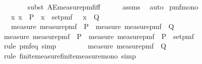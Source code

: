 \begin{isabellebody}
\ \ \ \ \ \ \isamarkupfalse%
\ {\isacharparenleft}{\kern0pt}subst\ AE{\isacharunderscore}{\kern0pt}measure{\isacharunderscore}{\kern0pt}pmf{\isacharunderscore}{\kern0pt}iff{\isacharparenright}{\kern0pt}\isanewline
\ \ \ \ \isamarkupfalse%
\ assms\ \isamarkupfalse%
\ auto%
\endisatagproof
{\isafoldproof}%
%
\isadelimproof
\isanewline
%
\endisadelimproof
\isanewline
{}\isamarkupfalse%
\ pmf{\isacharunderscore}{\kern0pt}mono{\isacharunderscore}{\kern0pt}{}{\isacharcolon}{\kern0pt}\isanewline
\ \ \ {\isachardoublequoteopen}{\isasymAnd}x{\isachardot}{\kern0pt}\ x\ {\isasymin}\ P\ {\isasymLongrightarrow}\ x\ {\isasymin}\ set{\isacharunderscore}{\kern0pt}pmf\ {\isasymOmega}\ {\isasymLongrightarrow}\ x\ {\isasymin}\ Q{\isachardoublequoteclose}\isanewline
\ \ \ {\isachardoublequoteopen}measure\ {\isacharparenleft}{\kern0pt}measure{\isacharunderscore}{\kern0pt}pmf\ {\isasymOmega}{\isacharparenright}{\kern0pt}\ P\ {\isasymle}\ measure\ {\isacharparenleft}{\kern0pt}measure{\isacharunderscore}{\kern0pt}pmf\ {\isasymOmega}{\isacharparenright}{\kern0pt}\ Q{\isachardoublequoteclose}\isanewline
%
\isadelimproof
%
\endisadelimproof
%
\isatagproof
{}\isamarkupfalse%
\ {\isacharminus}{\kern0pt}\isanewline
\ \ \isamarkupfalse%
\ {\isachardoublequoteopen}measure\ {\isacharparenleft}{\kern0pt}measure{\isacharunderscore}{\kern0pt}pmf\ {\isasymOmega}{\isacharparenright}{\kern0pt}\ P\ {\isacharequal}{\kern0pt}\ measure\ {\isacharparenleft}{\kern0pt}measure{\isacharunderscore}{\kern0pt}pmf\ {\isasymOmega}{\isacharparenright}{\kern0pt}\ {\isacharparenleft}{\kern0pt}P\ {\isasyminter}\ set{\isacharunderscore}{\kern0pt}pmf\ {\isasymOmega}{\isacharparenright}{\kern0pt}{\isachardoublequoteclose}\ \isanewline
\ \ \ \ \isamarkupfalse%
\ {\isacharparenleft}{\kern0pt}rule\ pmf{\isacharunderscore}{\kern0pt}eq{\isacharcomma}{\kern0pt}\ simp{\isacharparenright}{\kern0pt}\isanewline
\ \ \isamarkupfalse%
\ \isamarkupfalse%
\ {\isachardoublequoteopen}{\isachardot}{\kern0pt}{\isachardot}{\kern0pt}{\isachardot}{\kern0pt}\ {\isasymle}\ \ measure\ {\isacharparenleft}{\kern0pt}measure{\isacharunderscore}{\kern0pt}pmf\ {\isasymOmega}{\isacharparenright}{\kern0pt}\ Q{\isachardoublequoteclose}\isanewline
\ \ \isamarkupfalse%
\ {\isacharparenleft}{\kern0pt}rule\ finite{\isacharunderscore}{\kern0pt}measure{\isachardot}{\kern0pt}finite{\isacharunderscore}{\kern0pt}measure{\isacharunderscore}{\kern0pt}mono{\isacharcomma}{\kern0pt}\ simp{\isacharparenright}{\kern0pt}\isanewline

\end{isabellebody}
